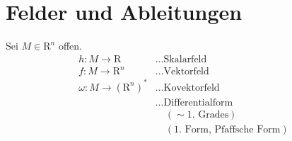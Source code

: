 \documentclass[ngerman]{tudscrreprt}
\begin{document}
\section{Felder und Ableitungen}
Sei $M \in \mathrm{R}^n$ offen. \\ 
\begin{equation*}
\begin{array}{ll}
h: M \to \mathrm{R} &\dots \text{Skalarfeld}\\ 
f: M \to \mathrm{R}^n &\dots \text{Vektorfeld}\\ 
\omega: M \to (\mathrm{R}^n)^* &\dots \text{Kovektorfeld}\\ 
&\dots \text{Differentialform}\\ 
& \quad (\sim \text{1. Grades})\\ 
&\quad(\text{1. Form, Pfaffsche Form})
\end{array}
\end{equation*}
\end{document}
